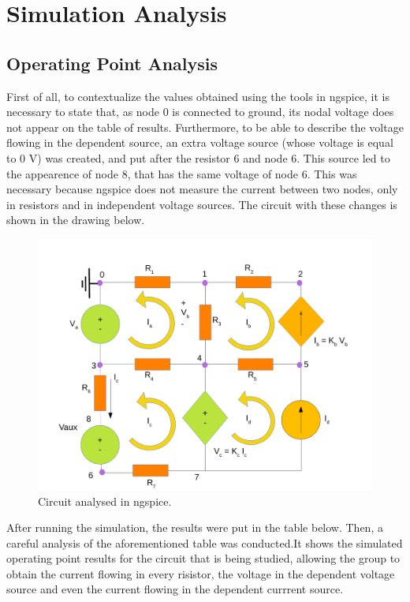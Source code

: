 
\section{Simulation Analysis}
\label{simulation}

\subsection{Operating Point Analysis}
First of all, to contextualize the values obtained using the tools in ngspice, it is necessary to state that, as node 0 is connected to ground, its nodal voltage does not appear on the table of results. Furthermore, to be able to describe the voltage flowing in the dependent source, an extra voltage source (whose voltage is equal to 0 V) was created, and put after the resistor 6 and node 6. This source led to the appearence of node 8, that has the same voltage of node 6. This was necessary because ngspice does not measure the current between two nodes, only in resistors and in independent voltage sources. The circuit with these changes is shown in the drawing below.

\begin{figure}[ht] \centering
\includegraphics[width=1.0\linewidth]{simdraw.pdf}
\caption{Circuit analysed in ngspice.}
\label{simdraw}
\end{figure}


After running the simulation, the results were put in the table below. Then, a careful analysis of the aforementioned table was conducted.It shows the simulated operating point results for the circuit that is being studied, allowing the group to obtain the current flowing in every risistor, the voltage in the dependent voltage source and even the current flowing in the dependent currrent source. 

